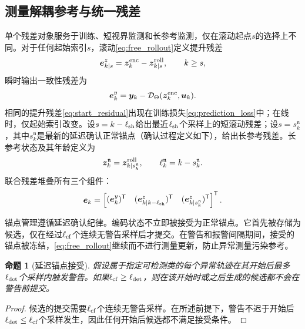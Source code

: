 \documentclass[journal]{IEEEtran}
\newtheorem{proposition}{命题}
\newcommand{\T}{\mathsf T}
\newcommand{\1}{\bm 1}
\begin{document}
\subsection{测量解耦参考与统一残差}
单个残差对象服务于训练、短视界监测和长参考监测，仅在滚动起点$s$的选择上不同。对于任何起始索引$s$，滚动\eqref{eq:free_rollout}定义提升残差
\begin{equation}
\bm e_{k\mid s}^z=\bm z_k^{\rm enc}-\bm z_{k\mid s}^{\rm roll},
\qquad k\geq s,
\label{eq:start_residual}
\end{equation}
瞬时输出一致性残差为
\begin{equation}
\bm e_k^y=\bm y_k-
\mathcal D_\Theta(\bm z_k^{\rm enc},\bm u_k).
\label{eq:output_residual}
\end{equation}
相同的提升残差\eqref{eq:start_residual}出现在训练损失\eqref{eq:prediction_loss}中；在线时，仅起始索引改变。设$s=k-\ell_{\rm sh}$给出最近$\ell_{\rm sh}$个采样上的短滚动残差；设$s=s_k^{\mathfrak n}$，其中$s_k^{\mathfrak n}$是最新的延迟确认正常锚点（确认过程定义如下），给出长参考残差。长参考状态及其年龄定义为
\begin{equation}
\bm z_k^{\mathfrak n}=\bm z_{k\mid s_k^{\mathfrak n}}^{\rm roll},\qquad
\ell_k^{\mathfrak n}=k-s_k^{\mathfrak n}.
\label{eq:normal_reference}
\end{equation}
联合残差堆叠所有三个组件：
\begin{equation}
\bm e_k=
\begin{bmatrix}
(\bm e_k^y)^\T&
(\bm e_{k\mid k-\ell_{\rm sh}}^z)^\T&
(\bm e_{k\mid s_k^{\mathfrak n}}^z)^\T
\end{bmatrix}^{\T}.
\label{eq:joint_residual}
\end{equation}

锚点管理遵循延迟确认纪律。编码状态不立即被接受为正常锚点。它首先被存储为候选，仅在经过$\ell_{\rm cf}$个连续无警告采样后才提交。在警告和报警间隔期间，接受的锚点被冻结，\eqref{eq:free_rollout}继续而不进行测量更新，防止异常测量污染参考。

\begin{proposition}[延迟锚点接受]
\label{prop:anchor}
假设属于指定可检测类的每个异常轨迹在其开始后最多$\ell_{\rm det}$个采样内触发警告。如果$\ell_{\rm cf}\geq\ell_{\rm det}$，则在该开始时或之后生成的候选都不会在警告前提交。
\end{proposition}

\begin{proof}
候选的提交需要$\ell_{\rm cf}$个连续无警告采样。在所述前提下，警告不迟于开始后$\ell_{\rm det}\leq\ell_{\rm cf}$个采样发生，因此任何开始后候选都不满足接受条件。
\end{proof}
\end{document}
